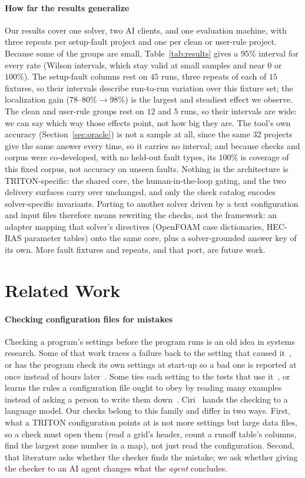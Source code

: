 \documentclass[conference]{IEEEtran}
\begin{document}
\paragraph{How far the results generalize} Our results cover one solver, two AI clients, and one
evaluation machine, with three repeats per setup-fault project and one per clean or user-rule
project. Because
some of the groups are small, Table~\ref{tab:results} gives a $95\%$ interval for every rate
(Wilson intervals, which stay valid at small samples and near $0$ or $100\%$). The setup-fault columns rest on $45$ runs, three repeats of each of $15$ fixtures, so
their intervals describe run-to-run variation over this fixture set; the localization gain ($78$--$80\%\!\to\!98\%$) is the largest and steadiest
effect we observe. The clean and user-rule groups
rest on $12$ and $5$ runs, so their intervals are wide: we can say which way those effects point,
not how big they are. The tool's own accuracy (Section~\ref{sec:oracle}) is not a sample at all,
since the same $32$ projects give the same answer every time, so it carries no interval; and
because checks and corpus were co-developed, with no held-out fault types, its $100\%$ is
coverage of this fixed corpus, not accuracy on unseen faults. Nothing in
the architecture is TRITON-specific: the shared core, the human-in-the-loop gating, and the two
delivery surfaces carry over unchanged, and only the check catalog encodes solver-specific
invariants. Porting to another solver driven by a text configuration and input files therefore
means rewriting the checks, not the framework: an adapter mapping that solver's directives
(OpenFOAM case dictionaries, HEC-RAS parameter tables) onto the
same core, plus a solver-grounded answer key of its own. More fault fixtures and repeats, and
that port, are future work.

\section{Related Work}
\label{sec:related}

\paragraph{Checking configuration files for mistakes}
Checking a program's settings before the program runs is an old idea in systems research. Some of
that work traces a failure back to the setting that caused it~\cite{confdiagnoser}, or has the
program check its own settings at start-up so a bad one is reported at once instead of hours
later~\cite{pcheck}. Some ties each setting to the tests that use it~\cite{ctests}, or learns the
rules a configuration file ought to obey by reading many examples instead of asking a person to
write them down~\cite{confspec}. Ciri~\cite{ciri} hands the checking to a language model. Our
checks belong to this family and differ in two ways. First, what a TRITON configuration points at
is not more settings but large data files, so a check must open them (read a grid's header, count
a runoff table's columns, find the largest zone number in a map), not just read the
configuration. Second, that literature asks whether the checker finds the mistake; we ask whether
giving the checker to an AI agent changes what the \emph{agent} concludes.
\end{document}
